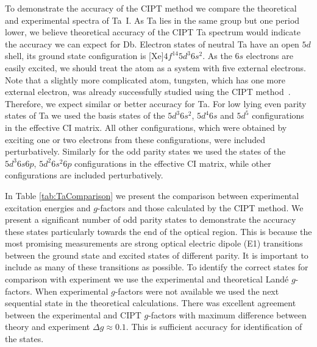 \documentclass[8pt,a4paper, twoside]{report}
\begin{document}
To demonstrate the accuracy of the CIPT method we compare the theoretical and experimental spectra of Ta~I. As Ta lies in the same group but one period lower, we believe theoretical accuracy of the CIPT Ta spectrum would indicate the accuracy we can expect for Db. Electron states of neutral Ta have an open $5d$ shell, its ground state configuration is [Xe]$4f^{14}5d^3 6s^2$. As the $6s$ electrons are easily excited, we should treat the atom as a system with five external electrons. Note that a slightly more complicated atom, tungsten, which has one more external electron, was already successfully studied using the CIPT method~\cite{DBHF2017}. Therefore, we expect similar or better accuracy for Ta. For low lying even parity states of Ta we used the basis states of the $5d^3 6s^2$, $5d^4 6s$ and $5d^5$  configurations in the effective CI matrix. All other configurations, which were obtained by exciting one or two electrons from these configurations, were included perturbatively. Similarly for the odd parity states we used the states of the $5d^3 6s 6p$, $5d^2 6s^2 6p$ configurations in the effective CI matrix, while other configurations are included perturbatively.

In Table \ref{tab:TaComparison} we present the comparison between experimental excitation energies and $g$-factors and those calculated by the CIPT method.  We present a significant number of odd parity states to demonstrate the accuracy these states particularly towards the end of the optical region. This is because the most promising measurements are strong optical electric dipole (E1) transitions between the ground state and excited states of different parity. 
It is important to include as many of these transitions as possible. To identify the correct states for comparison with experiment 
we use the experimental and theoretical Land\'{e} $g$-factors. When experimental $g$-factors were not available we used the next sequential state in the theoretical calculations. There was excellent agreement between the experimental and CIPT $g$-factors with maximum difference between theory and experiment $\Delta g \approx 0.1$. This is sufficient accuracy for identification of the states.
\end{document}
